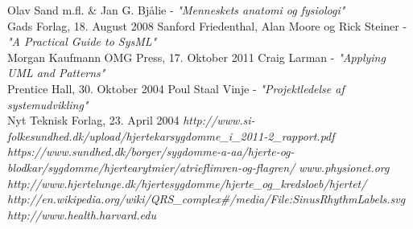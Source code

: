 \begin{thebibliography}{9}
 Olav Sand m.fl. \& Jan G. Bjålie - \textit{"Menneskets anatomi og fysiologi"}\\ Gads Forlag, 18. August 2008
 Sanford Friedenthal, Alan Moore og Rick Steiner - \textit{"A Practical Guide to SysML"} \\Morgan Kaufmann OMG Press, 17. Oktober 2011
 Craig Larman -
	\textit{"Applying UML and Patterns"}\\ Prentice Hall, 30. Oktober 2004
 Poul Staal Vinje - \textit{"Projektledelse af systemudvikling"}\\ Nyt Teknisk Forlag, 23. April 2004
 \textit{http://www.si-folkesundhed.dk/upload/hjertekarsygdomme\_i\_2011-2\_rapport.pdf}
 \textit{https://www.sundhed.dk/borger/sygdomme-a-aa/hjerte-og-blodkar/sygdomme/hjertearytmier/atrieflimren-og-flagren/}
 \textit{www.physionet.org}
\textit{http://www.hjertelunge.dk/hjertesygdomme/hjerte\_og\_kredsloeb/hjertet/}
 \textit{http://en.wikipedia.org/wiki/QRS\_complex\#/media/File:SinusRhythmLabels.svg}
 \textit{http://www.health.harvard.edu}

\end{thebibliography}